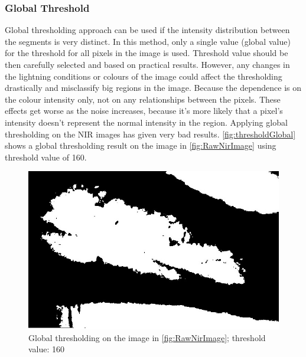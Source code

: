 \subsubsection{Global Threshold}
Global thresholding approach can be used if the intensity distribution between the segments is very distinct. In this method, only a single value (global value) for the threshold for all pixels in the image is used. Threshold value should be then carefully selected and based on practical results. However, any changes in the lightning conditions or colours of the image could affect the thresholding drastically and misclassify big regions in the image. Because the dependence is on the colour intensity only, not on any relationships between the pixels. These effects get worse as the noise increases, because it’s more likely that a pixel’s intensity doesn’t represent the normal intensity in the region. 
Applying global thresholding on the NIR images has given very bad results. \autoref{fig:thresholdGlobal} shows a global thresholding result on the image in \autoref{fig:RawNirImage} using threshold value of 160.

\begin{figure}[H]
\centering
\includegraphics[scale=0.6]{figures/thresholdGlobal.JPG}
\caption[Global thresholding example]{Global thresholding on the image in \autoref{fig:RawNirImage}; threshold value: 160}\label{fig:thresholdGlobal}
\end{figure}

